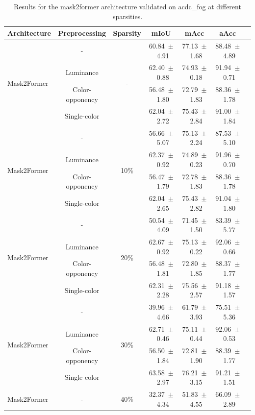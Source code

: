 \begin{table}[h]
\centering
\caption{Results for the mask2former architecture validated on acdc_fog at different sparsities.}
\begin{tabular}{@{}lccc ccc@{}}
\toprule
Architecture & Preprocessing & Sparsity & mIoU & mAcc & aAcc \\
\midrule

\multirow{4}{*}{Mask2Former} & - & \multirow{4}{*}{-} & 60.84~$\pm$~4.91 & 77.13~$\pm$~1.68 & 88.48~$\pm$~4.89 \\
& Luminance & & 62.40~$\pm$~0.88 & 74.93~$\pm$~0.18 & 91.94~$\pm$~0.71 \\
& Color-opponency & & 56.48~$\pm$~1.80 & 72.79~$\pm$~1.83 & 88.36~$\pm$~1.78 \\
& Single-color & & 62.04~$\pm$~2.72 & 75.43~$\pm$~2.84 & 91.00~$\pm$~1.84 \\
\midrule
\multirow{4}{*}{Mask2Former} & - & \multirow{4}{*}{10\%} & 56.66~$\pm$~5.07 & 75.13~$\pm$~2.24 & 87.53~$\pm$~5.10 \\
& Luminance & & 62.37~$\pm$~0.92 & 74.89~$\pm$~0.23 & 91.96~$\pm$~0.70 \\
& Color-opponency & & 56.47~$\pm$~1.79 & 72.78~$\pm$~1.83 & 88.36~$\pm$~1.78 \\
& Single-color & & 62.04~$\pm$~2.65 & 75.43~$\pm$~2.82 & 91.04~$\pm$~1.80 \\
\midrule
\multirow{4}{*}{Mask2Former} & - & \multirow{4}{*}{20\%} & 50.54~$\pm$~4.09 & 71.45~$\pm$~1.50 & 83.39~$\pm$~5.77 \\
& Luminance & & 62.67~$\pm$~0.92 & 75.13~$\pm$~0.22 & 92.06~$\pm$~0.66 \\
& Color-opponency & & 56.48~$\pm$~1.81 & 72.80~$\pm$~1.85 & 88.37~$\pm$~1.77 \\
& Single-color & & 62.31~$\pm$~2.28 & 75.56~$\pm$~2.57 & 91.18~$\pm$~1.57 \\
\midrule
\multirow{4}{*}{Mask2Former} & - & \multirow{4}{*}{30\%} & 39.96~$\pm$~4.66 & 61.79~$\pm$~3.93 & 75.51~$\pm$~5.36 \\
& Luminance & & 62.71~$\pm$~0.46 & 75.11~$\pm$~0.44 & 92.06~$\pm$~0.53 \\
& Color-opponency & & 56.50~$\pm$~1.84 & 72.81~$\pm$~1.90 & 88.39~$\pm$~1.77 \\
& Single-color & & 63.58~$\pm$~2.97 & 76.21~$\pm$~3.15 & 91.21~$\pm$~1.51 \\
\midrule
\multirow{4}{*}{Mask2Former} & - & \multirow{4}{*}{40\%} & 32.37~$\pm$~4.34 & 51.83~$\pm$~4.55 & 66.09~$\pm$~2.89 \\

\end{tabular}
\end{table}
